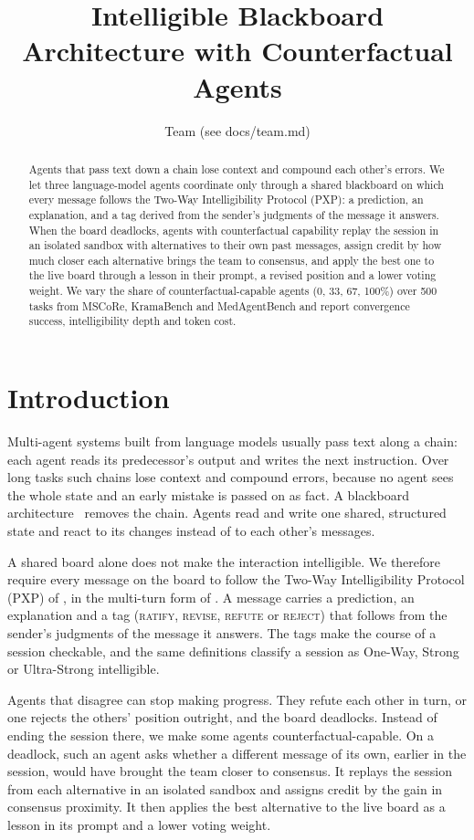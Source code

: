 \documentclass[11pt]{article}
\title{Intelligible Blackboard Architecture with Counterfactual Agents}
\author{Team (see docs/team.md)}
\date{}
\begin{document}
\maketitle

\begin{abstract}
Agents that pass text down a chain lose context and compound each other's errors. We let three
language-model agents coordinate only through a shared blackboard on which every message follows
the Two-Way Intelligibility Protocol (PXP): a prediction, an explanation, and a tag derived from
the sender's judgments of the message it answers. When the board deadlocks, agents with
counterfactual capability replay the session in an isolated sandbox with alternatives to their
own past messages, assign credit by how much closer each alternative brings the team to
consensus, and apply the best one to the live board through a lesson in their prompt, a revised
position and a lower voting weight. We vary the share of counterfactual-capable agents (0, 33,
67, 100\%) over 500 tasks from MSCoRe, KramaBench and MedAgentBench and report convergence
success, intelligibility depth and token cost.
\end{abstract}

\section{Introduction}
Multi-agent systems built from language models usually pass text along a chain: each agent reads
its predecessor's output and writes the next instruction. Over long tasks such chains lose
context and compound errors, because no agent sees the whole state and an early mistake is passed
on as fact. A blackboard architecture~\citep{erman1980} removes the chain. Agents read and write
one shared, structured state and react to its changes instead of to each other's messages.

A shared board alone does not make the interaction intelligible. We therefore require every
message on the board to follow the Two-Way Intelligibility Protocol (PXP) of \citet{baskar2023},
in the multi-turn form of \citet{mestha2025}. A message carries a prediction, an explanation and
a tag (\textsc{ratify}, \textsc{revise}, \textsc{refute} or \textsc{reject}) that follows from
the sender's judgments of the message it answers. The tags make the course of a session
checkable, and the same definitions classify a session as One-Way, Strong or Ultra-Strong
intelligible.

Agents that disagree can stop making progress. They refute each other in turn, or one rejects
the others' position outright, and the board deadlocks. Instead of ending the session there, we
make some agents counterfactual-capable. On a deadlock, such an agent asks whether a different
message of its own, earlier in the session, would have brought the team closer to consensus. It
replays the session from each alternative in an isolated sandbox and assigns credit by the gain
in consensus proximity. It then applies the best alternative to the live board as a lesson in
its prompt and a lower voting weight.
\end{document}
